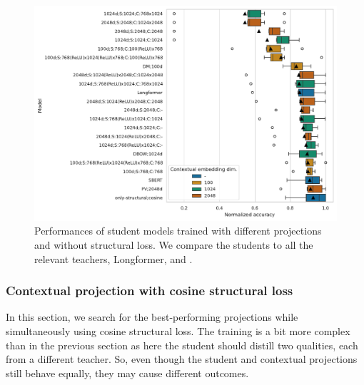 \begin{figure}

  \centering

  \includegraphics[width=\textwidth]{img/projections_contextual.pdf}

  \caption{Performances of student models trained with different projections
  and without structural loss. We compare the students to all the relevant
  teachers, Longformer, and .}

  \label{fig:projections_contextual}

\end{figure}

\subsubsection{Contextual projection with cosine structural
loss}\label{section:projections_cos}

In this section, we search for the best-performing projections while
simultaneously using cosine structural loss. The training is a bit more complex
than in the previous section as here the student should distill two qualities,
each from a different teacher. So, even though the student and contextual
projections still behave equally, they may cause different outcomes.

